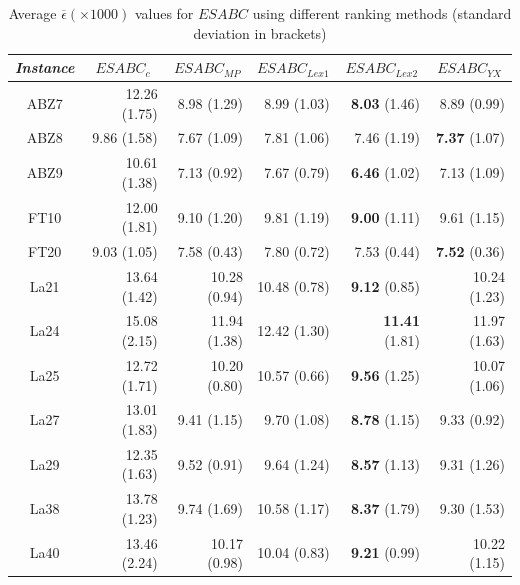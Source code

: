 \documentclass[icae]{iosart2x}
\begin{document}
\begin{table}[tbh]
\small
\centering
\caption{Average $\overline{\epsilon}(\times 1000)$ values for $ESABC$ using different ranking methods (standard deviation in brackets)}
\label{table:expResultsRob}
\begin{tabular}{c|r|r|r|r|r}
\toprule
\textit{Instance} & \multicolumn{1}{c|}{$ESABC_c$} & \multicolumn{1}{c|}{$ESABC_{MP}$} & \multicolumn{1}{c|}{$ESABC_{Lex1}$} & \multicolumn{1}{c|}{$ESABC_{Lex2}$} & \multicolumn{1}{c}{$ESABC_{YX}$} \\
\midrule
ABZ7 & 12.26 \tiny{(1.75)} & \cellcolor{gray!25}8.98 \tiny{(1.29)} & \cellcolor{gray!25}8.99 \tiny{(1.03)} & \cellcolor{gray!25}\textbf{8.03} \tiny{(1.46)} & \cellcolor{gray!25}8.89 \tiny{(0.99)} \\
ABZ8 & 9.86 \tiny{(1.58)} & \cellcolor{gray!25}7.67 \tiny{(1.09)} & \cellcolor{gray!25}7.81 \tiny{(1.06)} & \cellcolor{gray!25}7.46 \tiny{(1.19)} & \cellcolor{gray!25}\textbf{7.37} \tiny{(1.07)} \\
ABZ9 & 10.61 \tiny{(1.38)} & 7.13 \tiny{(0.92)} & 7.67 \tiny{(0.79)} & \cellcolor{gray!25}\textbf{6.46} \tiny{(1.02)} & 7.13 \tiny{(1.09)} \\
FT10 & 12.00 \tiny{(1.81)} & \cellcolor{gray!25}9.10 \tiny{(1.20)} & 9.81 \tiny{(1.19)} & \cellcolor{gray!25}\textbf{9.00} \tiny{(1.11)} & \cellcolor{gray!25}9.61 \tiny{(1.15)} \\
FT20 & 9.03 \tiny{(1.05)} & \cellcolor{gray!25}7.58 \tiny{(0.43)} & \cellcolor{gray!25}7.80 \tiny{(0.72)} & \cellcolor{gray!25}7.53 \tiny{(0.44)} & \cellcolor{gray!25}\textbf{7.52} \tiny{(0.36)} \\
La21 & 13.64 \tiny{(1.42)} & 10.28 \tiny{(0.94)} & 10.48 \tiny{(0.78)} & \cellcolor{gray!25}\textbf{9.12} \tiny{(0.85)} & 10.24 \tiny{(1.23)} \\
La24 & 15.08 \tiny{(2.15)} & \cellcolor{gray!25}11.94 \tiny{(1.38)} & 12.42 \tiny{(1.30)} & \cellcolor{gray!25}\textbf{11.41} \tiny{(1.81)} & \cellcolor{gray!25}11.97 \tiny{(1.63)} \\
La25 & 12.72 \tiny{(1.71)} & \cellcolor{gray!25}10.20 \tiny{(0.80)} & 10.57 \tiny{(0.66)} & \cellcolor{gray!25}\textbf{9.56} \tiny{(1.25)} & \cellcolor{gray!25}10.07 \tiny{(1.06)} \\
La27 & 13.01 \tiny{(1.83)} & \cellcolor{gray!25}9.41 \tiny{(1.15)} & 9.70 \tiny{(1.08)} & \cellcolor{gray!25}\textbf{8.78} \tiny{(1.15)} & \cellcolor{gray!25}9.33 \tiny{(0.92)} \\
La29 & 12.35 \tiny{(1.63)} & 9.52 \tiny{(0.91)} & 9.64 \tiny{(1.24)} & \cellcolor{gray!25}\textbf{8.57} \tiny{(1.13)} & \cellcolor{gray!25}9.31 \tiny{(1.26)} \\
La38 & 13.78 \tiny{(1.23)} & 9.74 \tiny{(1.69)} & 10.58 \tiny{(1.17)} & \cellcolor{gray!25}\textbf{8.37} \tiny{(1.79)} & \cellcolor{gray!25}9.30 \tiny{(1.53)} \\
La40 & 13.46 \tiny{(2.24)} & 10.17 \tiny{(0.98)} & 10.04 \tiny{(0.83)} & \cellcolor{gray!25}\textbf{9.21} \tiny{(0.99)} & 10.22 \tiny{(1.15)} \\
\end{tabular}
\end{table}
\end{document}
